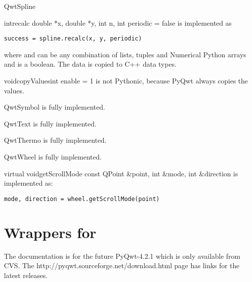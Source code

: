 \documentclass{manual}
\newcommand{\Download}{\ulink{download}
  {http://pyqwt.sourceforge.net/download.html}}
\newcommand{\Future}{
  \begin{notice}[warning]
    The documentation is for the future PyQwt-4.2.1 which is only available
    from CVS. The \Download{} page has links for the latest releases.
  \end{notice}
}
\begin{document}
\begin{classdesc*}{QwtSpline}
  
  \begin{cfuncdesc}{int}{recalc}{
      double *x, double *y, int n, int periodic = false}
    is implemented as
    \begin{verbatim}
success = spline.recalc(x, y, periodic)
    \end{verbatim}
    where  and  can be any combination of lists, tuples and
    Numerical Python arrays and  is a boolean.
    The data is copied to C++ data types.
  \end{cfuncdesc}
  
  \begin{cfuncdesc}{void}{copyValues}{int enable = 1}
    is not Pythonic, because PyQwt always copies the values.
  \end{cfuncdesc}

\end{classdesc*}
 
\begin{classdesc*}{QwtSymbol}
  is fully implemented.
\end{classdesc*}

\begin{classdesc*}{QwtText}
  is fully implemented.
\end{classdesc*}

\begin{classdesc*}{QwtThermo}
  is fully implemented.
\end{classdesc*}

\begin{classdesc*}{QwtWheel}
  is fully implemented.

  \begin{cfuncdesc}{virtual void}{getScrollMode}{
      const QPoint \&point, int \&mode, int \&direction}
    is implemented as:
    \begin{verbatim}
mode, direction = wheel.getScrollMode(point)
    \end{verbatim}    
  \end{cfuncdesc}

\end{classdesc*}

\section{Wrappers for  \label{qwtarray}}

\Future{}
\end{document}
